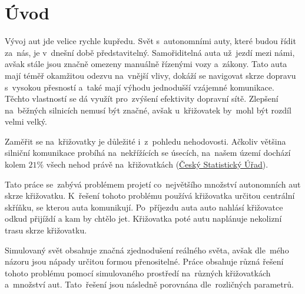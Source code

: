\chapter*{Úvod}\label{ch:uvod}

Vývoj aut jde velice rychle kupředu.
Svět s~autonomními auty, které budou řídit za~nás, je v~dnešní době představitelný.
Samořiditelná auta už~jezdí mezi námi, avšak stále jsou značně omezeny manuálně řízenými vozy a~zákony.
Tato auta mají téměř okamžitou odezvu na~vnější vlivy, dokáží se navigovat skrze dopravu s~vysokou přesností a~také mají výhodu jednodušší vzájemné komunikace.
Těchto vlastností se dá využít pro~zvýšení efektivity dopravní sítě.
Zlepšení na~běžných silnicích nemusí být značné, avšak u~křižovatek by~mohl být rozdíl velmi velký.

Zaměřit se na~křižovatky je důležité i~z~pohledu nehodovosti.
Ačkoliv většina silniční komunikace probíhá na~nekřížících se úsecích, na~našem území dochází kolem $21\%$ všech nehod
právě na~křižovatkách (\href{https://www.czso.cz/documents/10180/20534694/32025414a06.pdf}{Český Statistický Úřad}).

Tato práce se~zabývá problémem projetí co~největšího množství autonomních aut skrze křižovatku.
K~řešení tohoto problému používá křižovatka určitou centrální skříňku, se kterou auta komunikují.
Po~příjezdu auta auto nahlásí křižovatce odkud přijíždí a kam by chtělo jet.
Křižovatka poté autu naplánuje nekolizní trasu skrze křižovatku.

Simulovaný svět obsahuje značná zjednodušení reálného světa, avšak dle~mého názoru jsou nápady určitou formou přenositelné.
Práce obsahuje různá řešení tohoto problému pomocí simulovaného prostředí na~různých křižovatkách a~množství aut.
Tato~řešení jsou následně porovnána dle~rozličných parametrů.









